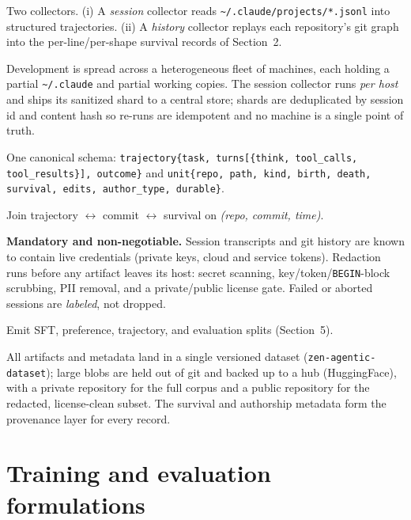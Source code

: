 \documentclass[11pt,letterpaper]{article}
\begin{document}
\begin{description}[leftmargin=1.2em]
\item[Extract.] Two collectors. (i) A \emph{session} collector reads
\texttt{\textasciitilde/.claude/projects/*.jsonl} into structured trajectories.
(ii) A \emph{history} collector replays each repository's git graph into the
per-line/per-shape survival records of Section~2.
\item[Fleet aggregation.] Development is spread across a heterogeneous fleet of
machines, each holding a partial \texttt{\textasciitilde/.claude} and partial
working copies. The session collector runs \emph{per host} and ships its
sanitized shard to a central store; shards are deduplicated by session id and
content hash so re-runs are idempotent and no machine is a single point of
truth.
\item[Normalize.] One canonical schema:
\texttt{trajectory\{task, turns[\{think, tool\_calls, tool\_results\}], outcome\}}
and \texttt{unit\{repo, path, kind, birth, death, survival, edits, author\_type,
durable\}}.
\item[Link.] Join trajectory $\leftrightarrow$ commit $\leftrightarrow$ survival
on \emph{(repo, commit, time)}.
\item[Redact.] \textbf{Mandatory and non-negotiable.} Session transcripts and git
history are known to contain live credentials (private keys, cloud and service
tokens). Redaction runs before any artifact leaves its host: secret scanning,
key/token/\texttt{BEGIN}-block scrubbing, PII removal, and a private/public
license gate. Failed or aborted sessions are \emph{labeled}, not dropped.
\item[Format.] Emit SFT, preference, trajectory, and evaluation splits
(Section~5).
\item[Version/store.] All artifacts and metadata land in a single versioned
dataset (\texttt{zen-agentic-dataset}); large blobs are held out of git and
backed up to a hub (HuggingFace), with a private repository for the full corpus
and a public repository for the redacted, license-clean subset. The survival and
authorship metadata form the provenance layer for every record.
\end{description}

\section{Training and evaluation formulations}
\end{document}
